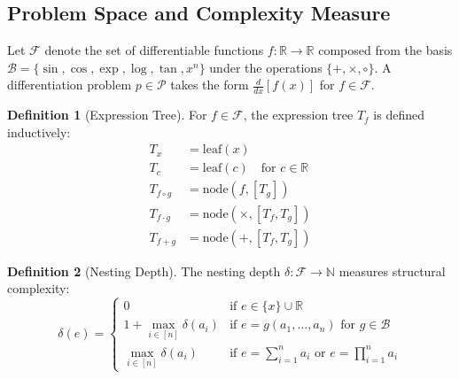 \documentclass[a4paper,fleqn]{cas-dc}
\theoremstyle{definition}
\newtheorem{definition}{Definition}
\begin{document}
\subsection{Problem Space and Complexity Measure}
\label{sec:problem}
Let $\mathcal{F}$ denote the set of differentiable functions $f: \mathbb{R} \rightarrow \mathbb{R}$ composed from the basis $\mathcal{B} = \{\sin, \cos, \exp, \log, \tan, x^n\}$ under the operations $\{+, \times, \circ\}$. A differentiation problem $p \in \mathcal{P}$ takes the form $\frac{d}{dx}[f(x)]$ for $f \in \mathcal{F}$.

\begin{definition}[Expression Tree]
\label{def:expr_tree}
For $f \in \mathcal{F}$, the expression tree $T_f$ is defined inductively:
\begin{align}
T_x &= \text{leaf}(x) \\
T_c &= \text{leaf}(c) \quad \text{for } c \in \mathbb{R} \\
T_{f \circ g} &= \text{node}(f, [T_g]) \\
T_{f \cdot g} &= \text{node}(\times, [T_f, T_g]) \\
T_{f + g} &= \text{node}(+, [T_f, T_g])
\end{align}
\end{definition}

\begin{definition}[Nesting Depth]
\label{def:depth}
The nesting depth $\delta: \mathcal{F} \rightarrow \mathbb{N}$ measures structural complexity:
\begin{equation}
\delta(e) = \begin{cases}
0 & \text{if } e \in \{x\} \cup \mathbb{R} \\[4pt]
1 + \max\limits_{i \in [n]} \delta(a_i) & \text{if } e = g(a_1, \ldots, a_n) \text{ for } g \in \mathcal{B} \\[4pt]
\max\limits_{i \in [n]} \delta(a_i) & \text{if } e = \sum_{i=1}^n a_i \text{ or } e = \prod_{i=1}^n a_i
\end{cases}
\end{equation}
\end{definition}
\end{document}
